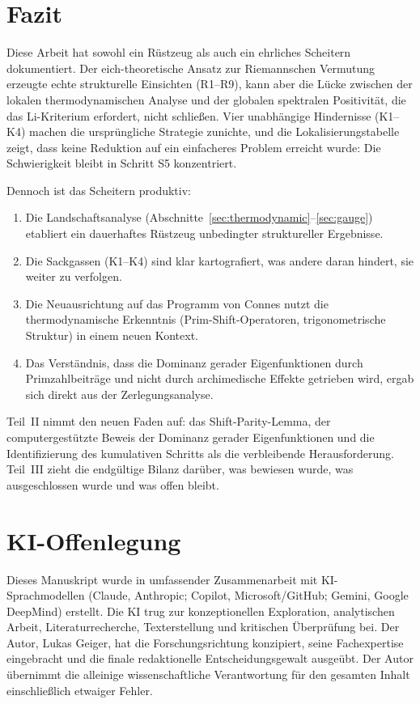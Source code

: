 \documentclass[12pt,a4paper]{article}
\theoremstyle{definition}
\theoremstyle{remark}
\begin{document}
\section{Fazit}
\label{sec:conclusion}

Diese Arbeit hat sowohl ein Rüstzeug als auch ein ehrliches Scheitern dokumentiert. Der eich-theoretische Ansatz zur Riemannschen Vermutung erzeugte echte strukturelle Einsichten (R1--R9), kann aber die Lücke zwischen der lokalen thermodynamischen Analyse und der globalen spektralen Positivität, die das Li-Kriterium erfordert, nicht schließen. Vier unabhängige Hindernisse (K1--K4) machen die ursprüngliche Strategie zunichte, und die Lokalisierungstabelle zeigt, dass keine Reduktion auf ein einfacheres Problem erreicht wurde: Die Schwierigkeit bleibt in Schritt S5 konzentriert.

Dennoch ist das Scheitern produktiv:
\begin{enumerate}
  \item Die Landschaftsanalyse (Abschnitte~\ref{sec:thermodynamic}--\ref{sec:gauge}) etabliert ein dauerhaftes Rüstzeug unbedingter struktureller Ergebnisse.
  \item Die Sackgassen (K1--K4) sind klar kartografiert, was andere daran hindert, sie weiter zu verfolgen.
  \item Die Neuausrichtung auf das Programm von Connes nutzt die thermodynamische Erkenntnis (Prim-Shift-Operatoren, trigonometrische Struktur) in einem neuen Kontext.
  \item Das Verständnis, dass die Dominanz gerader Eigenfunktionen durch Primzahlbeiträge und nicht durch archimedische Effekte getrieben wird, ergab sich direkt aus der Zerlegungsanalyse.
\end{enumerate}

Teil~II nimmt den neuen Faden auf: das Shift-Parity-Lemma, der computergestützte Beweis der Dominanz gerader Eigenfunktionen und die Identifizierung des kumulativen Schritts als die verbleibende Herausforderung. Teil~III zieht die endgültige Bilanz darüber, was bewiesen wurde, was ausgeschlossen wurde und was offen bleibt.


\section*{KI-Offenlegung}

Dieses Manuskript wurde in umfassender Zusammenarbeit mit KI-Sprachmodellen (Claude, Anthropic; Copilot, Microsoft/GitHub; Gemini, Google DeepMind) erstellt. Die KI trug zur konzeptionellen Exploration, analytischen Arbeit, Literaturrecherche, Texterstellung und kritischen \"Uberpr\"ufung bei. Der Autor, Lukas Geiger, hat die Forschungsrichtung konzipiert, seine Fachexpertise eingebracht und die finale redaktionelle Entscheidungsgewalt ausge\"ubt. Der Autor \"ubernimmt die alleinige wissenschaftliche Verantwortung f\"ur den gesamten Inhalt einschlie\ss{}lich etwaiger Fehler.
\end{document}
